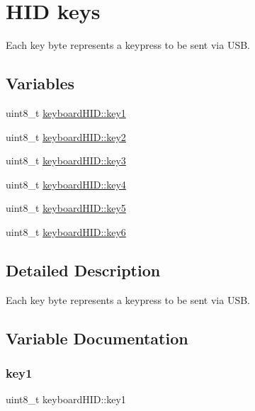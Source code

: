 \hypertarget{group__HID__keys}{}\section{H\+ID keys}
\label{group__HID__keys}


Each key byte represents a keypress to be sent via U\+SB.  


\subsection*{Variables}
\begin{DoxyCompactItemize}
\item 
uint8\+\_\+t \hyperlink{group__HID__keys_ga8d13499cb3958bd1513324ecfcc3cea2}{keyboard\+H\+I\+D\+::key1}
\item 
uint8\+\_\+t \hyperlink{group__HID__keys_ga32322c276df068828637c99ef9cf7efc}{keyboard\+H\+I\+D\+::key2}
\item 
uint8\+\_\+t \hyperlink{group__HID__keys_ga3f5f492cd68dc9ed37c0d5c105efa5c4}{keyboard\+H\+I\+D\+::key3}
\item 
uint8\+\_\+t \hyperlink{group__HID__keys_ga92ceb9b21b10f5cb65e70ae2a689b2f3}{keyboard\+H\+I\+D\+::key4}
\item 
uint8\+\_\+t \hyperlink{group__HID__keys_gab11bee72b1b28da4b8f0dec2c834a4db}{keyboard\+H\+I\+D\+::key5}
\item 
uint8\+\_\+t \hyperlink{group__HID__keys_ga47cb0263b63064de604d637f844af705}{keyboard\+H\+I\+D\+::key6}
\end{DoxyCompactItemize}


\subsection{Detailed Description}
Each key byte represents a keypress to be sent via U\+SB. 



\subsection{Variable Documentation}
\mbox{\label{group__HID__keys_ga8d13499cb3958bd1513324ecfcc3cea2}} 
\subsubsection{\texorpdfstring{key1}{key1}}
{\footnotesize\ttfamily uint8\+\_\+t keyboard\+H\+I\+D\+::key1}

